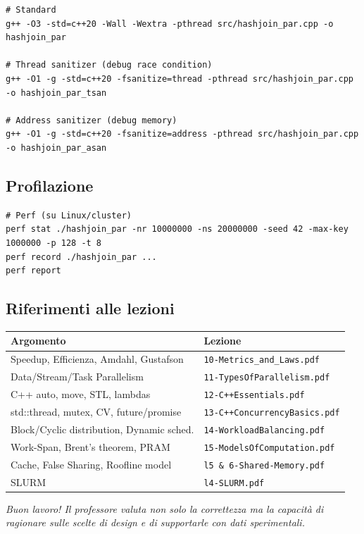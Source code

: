 \documentclass[11pt,a4paper]{article}
\begin{document}
\begin{lstlisting}[style=bash]
# Standard
g++ -O3 -std=c++20 -Wall -Wextra -pthread src/hashjoin_par.cpp -o hashjoin_par

# Thread sanitizer (debug race condition)
g++ -O1 -g -std=c++20 -fsanitize=thread -pthread src/hashjoin_par.cpp -o hashjoin_par_tsan

# Address sanitizer (debug memory)
g++ -O1 -g -std=c++20 -fsanitize=address -pthread src/hashjoin_par.cpp -o hashjoin_par_asan
\end{lstlisting}

\subsection{Profilazione}

\begin{lstlisting}[style=bash]
# Perf (su Linux/cluster)
perf stat ./hashjoin_par -nr 10000000 -ns 20000000 -seed 42 -max-key 1000000 -p 128 -t 8
perf record ./hashjoin_par ...
perf report
\end{lstlisting}

\subsection{Riferimenti alle lezioni}

\begin{center}\small
\begin{tabular}{ll}
\toprule
\textbf{Argomento} & \textbf{Lezione}\\\midrule
Speedup, Efficienza, Amdahl, Gustafson & \texttt{10-Metrics\_and\_Laws.pdf}\\
Data/Stream/Task Parallelism & \texttt{11-TypesOfParallelism.pdf}\\
C++ auto, move, STL, lambdas & \texttt{12-C++Essentials.pdf}\\
std::thread, mutex, CV, future/promise & \texttt{13-C++ConcurrencyBasics.pdf}\\
Block/Cyclic distribution, Dynamic sched. & \texttt{14-WorkloadBalancing.pdf}\\
Work-Span, Brent's theorem, PRAM & \texttt{15-ModelsOfComputation.pdf}\\
Cache, False Sharing, Roofline model & \texttt{l5 \& 6-Shared-Memory.pdf}\\
SLURM & \texttt{l4-SLURM.pdf}\\
\bottomrule
\end{tabular}
\end{center}

\vfill
\begin{center}
\textit{Buon lavoro! Il professore valuta non solo la correttezza ma la capacità di ragionare sulle scelte di design e di supportarle con dati sperimentali.}
\end{center}
\end{document}
